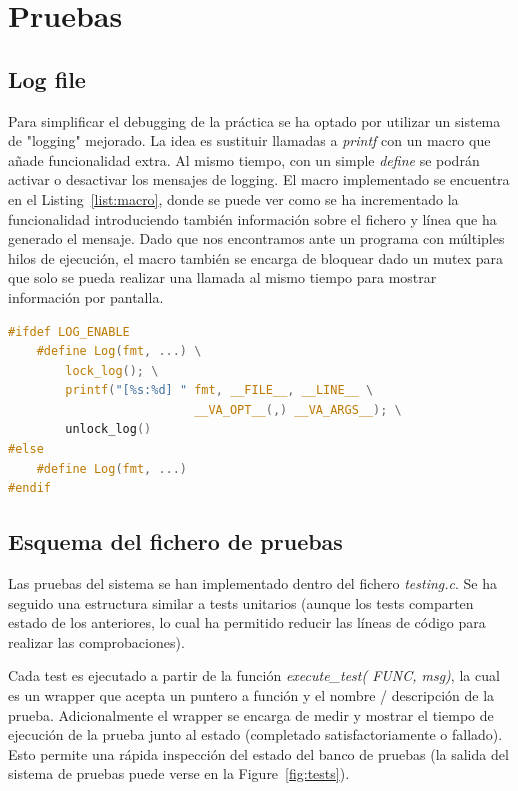 \section{Pruebas}

\subsection{Log file}

Para simplificar el debugging de la práctica se ha optado por utilizar un sistema de "logging" mejorado.
La idea es sustituir llamadas a \textit{printf} con un macro que añade funcionalidad extra.
Al mismo tiempo, con un simple \textit{define} se podrán activar o desactivar los mensajes de logging.
El macro implementado se encuentra en el Listing~\ref{list:macro}, donde se puede ver como se ha incrementado la funcionalidad introduciendo también información sobre el fichero y línea que ha generado el mensaje.
Dado que nos encontramos ante un programa con múltiples hilos de ejecución, el macro también se encarga de bloquear dado un mutex para que solo se pueda realizar una llamada al mismo tiempo para mostrar información por pantalla.

\begin{lstlisting}[language=c, label=list:macro, caption={Macro que implementa la funcionalidad extendida de logging.},captionpos=b]
#ifdef LOG_ENABLE
    #define Log(fmt, ...) \
        lock_log(); \
        printf("[%s:%d] " fmt, __FILE__, __LINE__ \
                          __VA_OPT__(,) __VA_ARGS__); \
        unlock_log()
#else
    #define Log(fmt, ...)
#endif
\end{lstlisting}

\subsection{Esquema del fichero de pruebas}

Las pruebas del sistema se han implementado dentro del fichero \textit{testing.c}.
Se ha seguido una estructura similar a tests unitarios (aunque los tests comparten estado de los anteriores, lo cual ha permitido reducir las líneas de código para realizar las comprobaciones).

Cada test es ejecutado a partir de la función \textit{execute\_test( FUNC, msg)}, la cual es un wrapper que acepta un puntero a función y el nombre / descripción de la prueba.
Adicionalmente el wrapper se encarga de medir y mostrar el tiempo de ejecución de la prueba junto al estado (completado satisfactoriamente o fallado).
Esto permite una rápida inspección del estado del banco de pruebas (la salida del sistema de pruebas puede verse en la Figure~\ref{fig:tests}).

